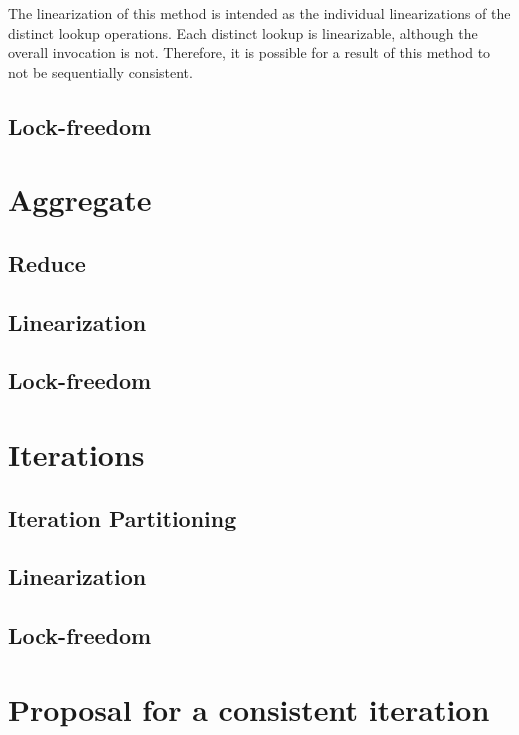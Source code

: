 The linearization of this method is intended as the individual linearizations of the distinct lookup operations.
Each distinct lookup is linearizable, although the overall invocation is not.
Therefore, it is possible for a result of this method to not be sequentially consistent.


\subsection{Lock-freedom}

\section{Aggregate}\label{sec:aggregate}

\subsection{Reduce}\label{subsec:reduce}

\subsection{Linearization}
\subsection{Lock-freedom}

\section{Iterations}\label{sec:partitioned-iterations}

\subsection{Iteration Partitioning}\label{subsec:iteration-partitioning}

\subsection{Linearization}
\subsection{Lock-freedom}

\section{Proposal for a consistent iteration}\label{sec:consistent-iteration}

